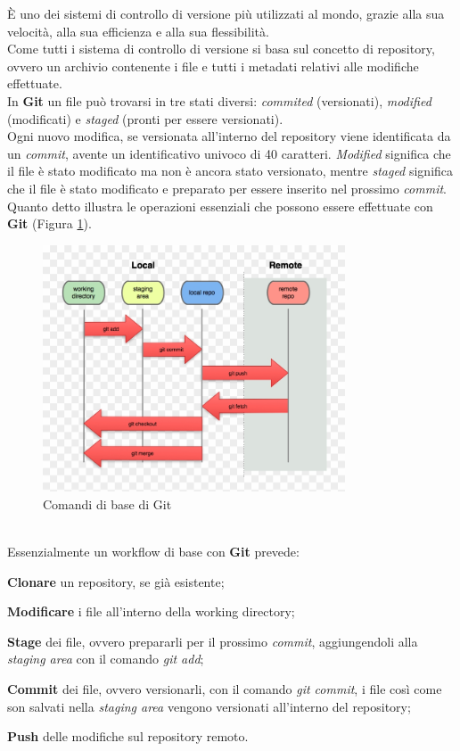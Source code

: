 \noindent È uno dei sistemi di controllo di versione più utilizzati al mondo, grazie alla sua velocità, alla sua efficienza e alla sua flessibilità.\\
Come tutti i sistema di controllo di versione si basa sul concetto di \gls{repository}{}, ovvero un archivio contenente i file e tutti i 
\gls{metadati}{} relativi alle modifiche effettuate.\\  
In \textbf{Git} un file può trovarsi in tre stati diversi: \textit{commited} (versionati), \textit{modified} (modificati) e \textit{staged} (pronti per essere versionati).\\
Ogni nuovo modifica, se versionata all'interno del \gls{repository} viene identificata da un \textit{commit}, avente un identificativo univoco di 40 caratteri. \textit{Modified} 
significa che il file è stato modificato ma non è ancora stato versionato, mentre \textit{staged} significa che il file è stato modificato e preparato per essere inserito nel 
prossimo \textit{commit}.\\
Quanto detto illustra le operazioni essenziali che possono essere effettuate con \textbf{Git} (Figura \ref{fig:git_workflow}).
\begin{figure}[h]
    \centering
    \includegraphics[width=0.8\textwidth]{images/tecnologie/comandi_git.png}
    \caption{Comandi di base di Git}
    \label{fig:git_workflow}
\end{figure}
\\


Essenzialmente un workflow di base con \textbf{Git} prevede:
\begin{list}{-}{}
    \item \textbf{Clonare} un \gls{repository}{}, se già esistente;
    \item \textbf{Modificare} i file all'interno della \gls{working directory}{};
    \item \textbf{Stage} dei file, ovvero prepararli per il prossimo \textit{commit}, aggiungendoli alla \textit{staging area} con il comando \textit{git add};
    \item \textbf{Commit} dei file, ovvero versionarli, con il comando \textit{git commit}, i file così come son salvati nella \textit{staging area} vengono versionati all'interno del \gls{repository}{};
    \item \textbf{Push} delle modifiche sul \gls{repository}{} remoto.
\end{list}
\pagebreak
